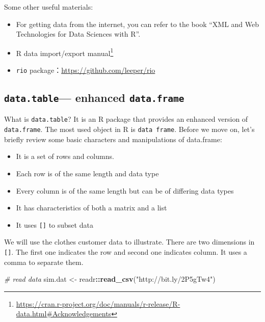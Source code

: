 \documentclass[12pt,]{krantz}
\makeatletter
\newenvironment{Shaded}{\begin{snugshade}}{\end{snugshade}}
\newcommand{\CommentTok}[1]{\textcolor[rgb]{0.37,0.37,0.37}{\textit{#1}}}
\newcommand{\KeywordTok}[1]{\textcolor[rgb]{0.27,0.27,0.27}{\textbf{#1}}}
\newcommand{\NormalTok}[1]{#1}
\newcommand{\OperatorTok}[1]{\textcolor[rgb]{0.43,0.43,0.43}{\textbf{#1}}}
\newcommand{\StringTok}[1]{\textcolor[rgb]{0.5,0.5,0.5}{#1}}
\providecommand{\tightlist}{%
  \setlength{\itemsep}{0pt}\setlength{\parskip}{0pt}}
\renewcommand{\href}[2]{#2\footnote{\url{#1}}}
\newenvironment{kframe}{%
\medskip{}
\setlength{\fboxsep}{.8em}
 \def\at@end@of@kframe{}%
 \ifinner\ifhmode%
  \def\at@end@of@kframe{\end{minipage}}%
  \begin{minipage}{\columnwidth}%
 \fi\fi%
 \def\FrameCommand##1{\hskip\@totalleftmargin \hskip-\fboxsep
 \colorbox{shadecolor}{##1}\hskip-\fboxsep
     \hskip-\linewidth \hskip-\@totalleftmargin \hskip\columnwidth}%
 \MakeFramed {\advance\hsize-\width
   \@totalleftmargin\z@ \linewidth\hsize
   \@setminipage}}%
 {\par\unskip\endMakeFramed%
 \at@end@of@kframe}
\renewenvironment{Shaded}{\begin{kframe}}{\end{kframe}}
\makeatother
\begin{document}
Some other useful materials:

\begin{itemize}
\tightlist
\item
  For getting data from the internet, you can refer to the book ``XML and Web Technologies for Data Sciences with R''.\\
\item
  \href{https://cran.r-project.org/doc/manuals/r-release/R-data.html\#Acknowledgements}{R data import/export manual}
\item
  \texttt{rio} package：\url{https://github.com/leeper/rio}
\end{itemize}

\hypertarget{data.table-enhanced-data.frame}{%
\subsection{\texorpdfstring{\texttt{data.table}--- enhanced \texttt{data.frame}}{data.table--- enhanced data.frame}}\label{data.table-enhanced-data.frame}}

What is \texttt{data.table}? It is an R package that provides an enhanced version of \texttt{data.frame}. The most used object in R is \texttt{data\ frame}. Before we move on, let's briefly review some basic characters and manipulations of data.frame:

\begin{itemize}
\tightlist
\item
  It is a set of rows and columns.
\item
  Each row is of the same length and data type
\item
  Every column is of the same length but can be of differing data types
\item
  It has characteristics of both a matrix and a list
\item
  It uses \texttt{{[}{]}} to subset data
\end{itemize}

We will use the clothes customer data to illustrate. There are two dimensions in \texttt{{[}{]}}. The first one indicates the row and second one indicates column. It uses a comma to separate them.

\begin{Shaded}
\begin{Highlighting}[]
\CommentTok{# read data}
\NormalTok{sim.dat <-}\StringTok{ }\NormalTok{readr}\OperatorTok{::}\KeywordTok{read_csv}\NormalTok{(}\StringTok{"http://bit.ly/2P5gTw4"}\NormalTok{)}
\end{Highlighting}
\end{Shaded}
\end{document}
